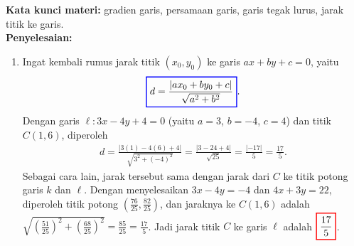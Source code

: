 \documentclass[10pt,openany,a4paper]{article}
\theoremstyle{definition}
\theoremstyle{definition}
\theoremstyle{plain}
\newenvironment{jawab}[2][tes]{%
\par\noindent\textbf{Kata kunci materi:} #1.\\
\textbf{Penyelesaian:} #2%
}{}
\begin{document}
\begin{enumerate}
\begin{jawab}[gradien garis, persamaan garis, garis tegak lurus, jarak titik ke garis]
{\begin{enumerate}
\begin{align*}
                y - 6 &= -\frac{4}{3}(x - 1)\\
                y &= -\frac{4}{3}x + \frac{4}{3} + 6\\
                y &= -\frac{4}{3}x + \frac{22}{3}.
            \end{align*}
            Jadi persamaan garis $k$ adalah $\colorlet{oldcolor}{.}
        \color{red}
        \setlength{\fboxrule}{1pt} \boxed{\color{oldcolor}y = -\frac{4}{3}x + \frac{22}{3}}\color{oldcolor}$ atau $4x+3y=22$.
            \item Ingat kembali rumus jarak titik $(x_0,y_0)$ ke garis $ax+by+c=0$, yaitu
            \begin{align*}
                \colorlet{oldcolor}{.}
        \color{blue}
        \setlength{\fboxrule}{1pt} \boxed{\color{oldcolor}d = \frac{|ax_0+by_0+c|}{\sqrt{a^2+b^2}}}\color{oldcolor}.
            \end{align*}
            Dengan garis $\ell: 3x-4y+4=0$ (yaitu $a=3$, $b=-4$, $c=4$) dan titik $C(1,6)$, diperoleh
            \begin{align*}
                d = \frac{|3(1)-4(6)+4|}{\sqrt{3^2+(-4)^2}} = \frac{|3-24+4|}{\sqrt{25}} = \frac{|-17|}{5} = \frac{17}{5}.
            \end{align*}
            Sebagai cara lain, jarak tersebut sama dengan jarak dari $C$ ke titik potong garis $k$ dan $\ell$. Dengan menyelesaikan $3x-4y=-4$ dan $4x+3y=22$, diperoleh titik potong $\left(\frac{76}{25},\frac{82}{25}\right)$, dan jaraknya ke $C(1,6)$ adalah $\sqrt{\left(\frac{51}{25}\right)^2+\left(\frac{68}{25}\right)^2}=\frac{85}{25}=\frac{17}{5}$. Jadi jarak titik $C$ ke garis $\ell$ adalah $\colorlet{oldcolor}{.}
        \color{red}
        \setlength{\fboxrule}{1pt} \boxed{\color{oldcolor}\frac{17}{5}}\color{oldcolor}$.
        \end{enumerate}
    }
    \end{jawab}


\end{enumerate}
\end{document}
